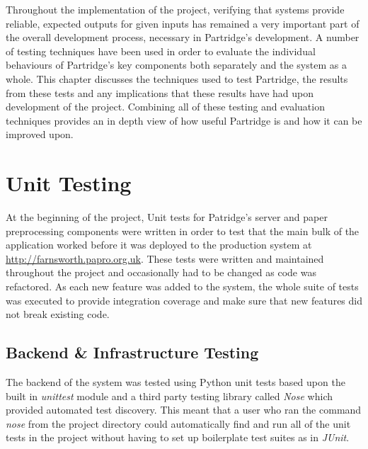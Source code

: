 %  
%

Throughout the implementation of the project, verifying that systems provide
reliable, expected outputs for given inputs has remained a very important part
of the overall development process, necessary in Partridge's development.  A
number of testing techniques have been used in order to evaluate the individual
behaviours of Partridge's key components both separately and the system as a
whole. This chapter discusses the techniques used to test Partridge, the
results from these tests and any implications that these results have had upon
development of the project. Combining all of these testing and evaluation
techniques provides an in depth view of how useful Partridge is and how it can
be improved upon.

\section{ Unit Testing }

At the beginning of the project, Unit tests for Patridge's server and paper
preprocessing components were written in order to test that the main bulk of
the application worked before it was deployed to the production system at
\url{http://farnsworth.papro.org.uk}. These tests were written and maintained
throughout the project and occasionally had to be changed as code was
refactored. As each new feature was added to the system, the whole suite of
tests was executed to provide integration coverage and make sure that new
features did not break existing code. 

\subsection{ Backend \& Infrastructure Testing}

The backend of the system was tested using Python unit tests based upon the
built in \emph{unittest} module and a third party testing library called
\emph{Nose} which provided automated test discovery. This meant that a user who
ran the command \emph{nose} from the project directory could automatically find
and run all of the unit tests in the project without having to set up
boilerplate test suites as in \emph{JUnit}.

